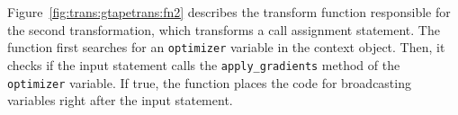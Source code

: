 Figure~\ref{fig:trans:gtapetrans:fn2} describes the transform function
responsible for the second transformation, which transforms a call assignment
statement.
The function first searches for an {\tt optimizer} variable in the context
object.
Then, it checks if the input statement calls the {\tt apply\_gradients} method
of the {\tt optimizer} variable.
If true, the function places the code for broadcasting variables right after
the input statement.


% 
% 
% 
